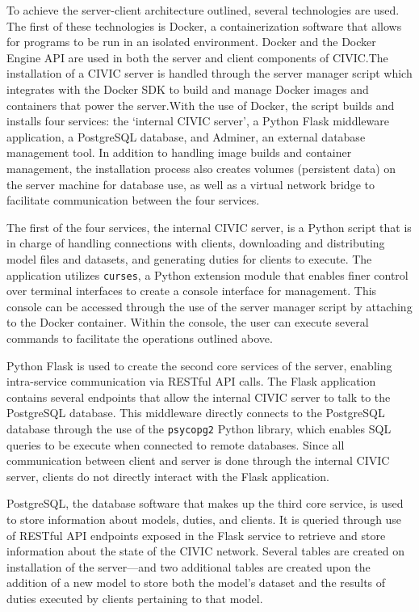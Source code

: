 \documentclass[11pt]{article}
\begin{document}
To achieve the server-client architecture outlined, several technologies are used. The first of these technologies is Docker, a containerization software that allows for programs to be run in an isolated environment. Docker and the Docker Engine API are used in both the server and client components of CIVIC.\@ The installation of a CIVIC server is handled through the server manager script which integrates with the Docker SDK to build and manage Docker images and containers that power the server.\@ With the use of Docker, the script builds and installs four services: the `internal CIVIC server', a Python Flask middleware application, a PostgreSQL database, and Adminer, an external database management tool. In addition to handling image builds and container management, the installation process also creates volumes (persistent data) on the server machine for database use, as well as a virtual network bridge to facilitate communication between the four services. 

The first of the four services, the internal CIVIC server, is a Python script that is in charge of handling connections with clients, downloading and distributing model files and datasets, and generating duties for clients to execute. The application utilizes \verb|curses|, a Python extension module that enables finer control over terminal interfaces to create a console interface for management. This console can be accessed through the use of the server manager script by attaching to the Docker container. Within the console, the user can execute several commands to facilitate the operations outlined above. 

Python Flask is used to create the second core services of the server, enabling intra-service communication via RESTful API calls. The Flask application contains several endpoints that allow the internal CIVIC server to talk to the PostgreSQL database. This middleware directly connects to the PostgreSQL database through the use of the \verb|psycopg2| Python library, which enables SQL queries to be execute when connected to remote databases. Since all communication between client and server is done through the internal CIVIC server, clients do not directly interact with the Flask application. 

PostgreSQL, the database software that makes up the third core service, is used to store information about models, duties, and clients. It is queried through use of RESTful API endpoints exposed in the Flask service to retrieve and store information about the state of the CIVIC network. Several tables are created on installation of the server---and two additional tables are created upon the addition of a new model to store both the model's dataset and the results of duties executed by clients pertaining to that model. 
\end{document}
